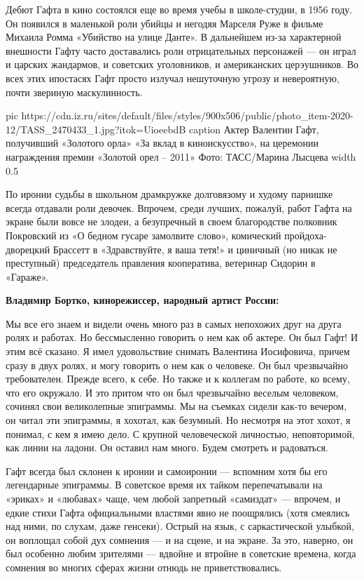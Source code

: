 \endgroup

Дебют Гафта в кино состоялся еще во время учебы в школе-студии, в 1956 году. Он
появился в маленькой роли убийцы и негодяя Марселя Руже в фильме Михаила Ромма
«Убийство на улице Данте». В дальнейшем из-за характерной внешности Гафту часто
доставались роли отрицательных персонажей — он играл и царских жандармов, и
советских уголовников, и американских церэушников. Во всех этих ипостасях Гафт
просто излучал нешуточную угрозу и невероятную, почти звериную маскулинность.

\ifcmt
  pic https://cdn.iz.ru/sites/default/files/styles/900x506/public/photo_item-2020-12/TASS_2470433_1.jpg?itok=UioeebdB
  caption Актер Валентин Гафт, получивший «Золотого орла» «За вклад в киноискусство», на церемонии награждения премии «Золотой орел – 2011» Фото: ТАСС/Марина Лысцева
  width 0.5
\fi

По иронии судьбы в школьном драмкружке долговязому и худому парнишке всегда
отдавали роли девочек. Впрочем, среди лучших, пожалуй, работ Гафта на экране
были вовсе не злодеи, а безупречный в своем благородстве полковник Покровский
из «О бедном гусаре замолвите слово», комический пройдоха-дворецкий Брассетт в
«Здравствуйте, я ваша тетя!» и циничный (но никак не преступный) председатель
правления кооператива, ветеринар Сидорин в «Гараже».

\textbf{Владимир Бортко, кинорежиссер, народный артист России:}
  
\begingroup
\styleMP
Мы все его знаем и видели очень много раз в
самых непохожих друг на друга ролях и работах. Но бессмысленно
говорить о нем как об актере. Он был Гафт! И этим всё сказано. Я имел
удовольствие снимать Валентина Иосифовича, причем сразу в двух ролях,
и могу говорить о нем как о человеке. Он был чрезвычайно
требователен. Прежде всего, к себе. Но также и к коллегам по работе,
ко всему, что его окружало. И это притом что он был чрезвычайно
веселым человеком, сочинял свои великолепные эпиграммы. Мы на съемках
сидели как-то вечером, он читал эти эпиграммы, я хохотал, как
безумный. Но несмотря на этот хохот, я понимал, с кем я имею дело. С
крупной человеческой личностью, неповторимой, как линии на ладони. Он
оставил нам много. Будем смотреть и радоваться.
\endgroup

Гафт всегда был склонен к иронии и самоиронии — вспомним хотя бы его
легендарные эпиграммы. В советское время их тайком перепечатывали на «эриках» и
«любавах» чаще, чем любой запретный «самиздат» — впрочем, и едкие стихи Гафта
официальными властями явно не поощрялись (хотя смеялись над ними, по слухам,
даже генсеки). Острый на язык, с саркастической улыбкой, он воплощал собой дух
сомнения — и на сцене, и на экране. За это, наверно, он был особенно любим
зрителями — вдвойне и втройне в советские времена, когда сомнения во многих
сферах жизни отнюдь не приветствовались.

